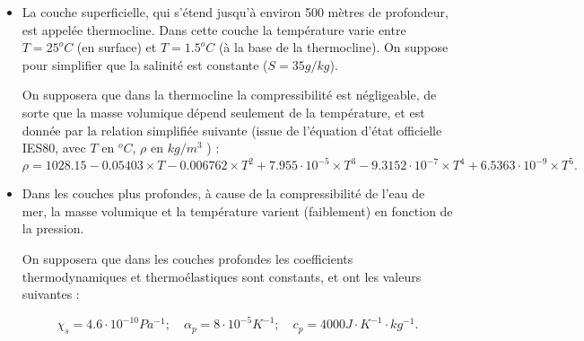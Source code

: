 \begin{itemize}

\item La couche superficielle, qui s'étend jusqu'à environ 500 mètres de 
profondeur, est appelée thermocline. Dans cette couche la température
varie entre $T = 25^o C$ (en surface) et $T = 1.5^o C$ (à la base de la
thermocline). On suppose pour simplifier que la salinité est constante ($S = 35g/kg$).

On supposera que dans la thermocline la compressibilité est négligeable, de sorte que 
la masse volumique dépend seulement de la température, et est donnée par la relation 
simplifiée suivante (issue de l'équation d'état officielle IES80, avec $T$ en $^o C$, $\rho$ en $kg/m^3$ ) :
$$ 
\rho = 1028.15 - 0.05403 \times T - 0.006762\times  T^2 +7.955\cdot 10^{-5} \times T^3 - 9.3152 \cdot 10^{-7} \times T^4
+ 6.5363  \cdot 10^{-9}  \times T^5.
$$




\item Dans les couches plus profondes,  à cause de la compressibilité de l'eau de mer, la masse volumique et la température varient (faiblement) en fonction de la pression.

On supposera que dans les couches profondes les coefficients
thermodynamiques et thermoélastiques sont constants, et ont les valeurs suivantes :

$$
\chi_s = 4.6 \cdot 10^{-10} Pa^{-1} ; \quad 
\alpha_p = 8 \cdot 10^{-5} K^{-1} ; \quad 
c_p = 4000 J \cdot K^{-1} \cdot kg^{-1}.  
$$







\end{itemize}

